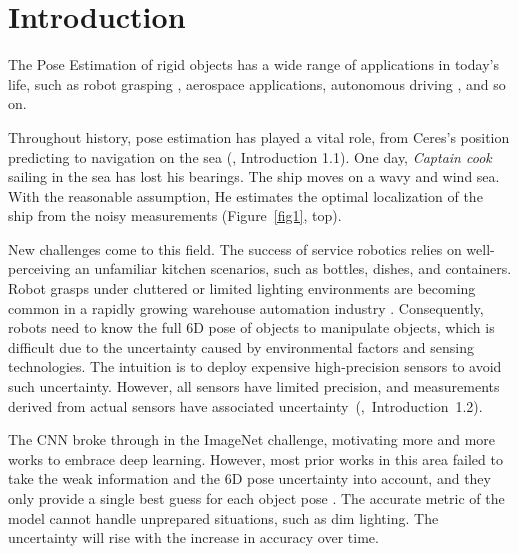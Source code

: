 \documentclass[micromachines,article,accept,pdftex,moreauthors]{Definitions/mdpi}
\begin{document}

\section{Introduction} \label{sec:intro}

The Pose %
Estimation of rigid objects has a wide range of applications in today's life, such as {robot grasping} \cite{linRoboticGraspingMultiView2021}, aerospace applications, autonomous driving \cite{qidan2017rapid}, and so on.

Throughout history, pose estimation has played {a} vital role{, from Ceres's position predicting to navigation on the sea} (\cite{barfootStateEstimationRobotics2021}, {Introduction 1.1}).%
{One day, } \textit{Captain cook} {sailing in the sea has lost his bearings. The ship moves on a wavy and wind sea. With the reasonable assumption, He estimates the optimal localization of the ship from the noisy measurements} (Figure~\ref{fig1}, top). %

New challenges come to this field. The success of service robotics relies on well-perceiving an unfamiliar kitchen scenarios, such as bottles, dishes, and containers. Robot grasps under cluttered or limited lighting environments are becoming common in a rapidly growing warehouse automation industry \cite{zengRoboticPickandPlaceNovel2018}. Consequently, robots need to know the full 6D pose of objects to manipulate objects, which is difficult due to the uncertainty caused by environmental factors and sensing technologies. The intuition is to deploy expensive high-precision sensors to avoid such {uncertainty}. However, all sensors have limited precision, and measurements derived from actual sensors have associated uncertainty~\mbox{(\cite{barfootStateEstimationRobotics2021}, Introduction 1.2).} %

 {The CNN \cite{krizhevsky2012imagenet} broke through in the ImageNet \cite{deng2009imagenet} challenge, motivating more and more works to embrace deep learning. However,}  most prior works in this area {failed} %
 to take the weak information \cite{shamsfakhr2020gsr} and the {6D pose uncertainty} into account, and they only provide a single best guess for {each} %
 object pose \cite{okornLearningOrientationDistributions2020, xiangPoseCNNConvolutionalNeural2018, wangDenseFusion6DObject2019}. The accurate metric of the model cannot handle unprepared situations, such as dim lighting. The uncertainty will rise with the increase in accuracy over time.
\end{document}
